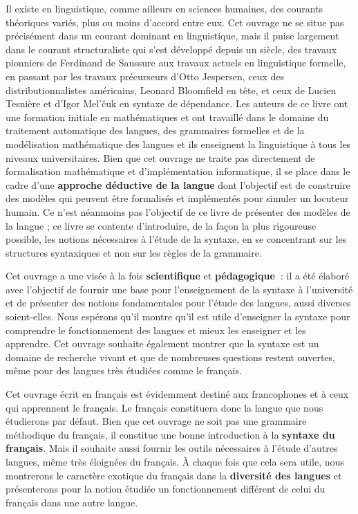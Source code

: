 Il existe en linguistique, comme ailleurs en sciences humaines, des courants théoriques variés, plus ou moins d’accord entre eux. Cet ouvrage ne se situe pas précisément dans un courant dominant en linguistique, mais il puise largement dans le courant structuraliste qui s’est développé depuis un siècle, des travaux pionniers de Ferdinand de Saussure aux travaux actuels en linguistique formelle, en passant par les travaux précurseurs d’Otto Jespersen, ceux des distributionnalistes américains, Leonard Bloomfield en tête, et ceux de Lucien Tesnière et d’Igor Mel’čuk en syntaxe de dépendance. Les auteurs de ce livre ont une formation initiale en mathématiques et ont travaillé dans le domaine du traitement automatique des langues, des grammaires formelles et de la modélisation mathématique des langues et ils enseignent la linguistique à tous les niveaux universitaires. Bien que cet ouvrage ne traite pas directement de formalisation mathématique et d’implémentation informatique, il se place dans le cadre d’une \textbf{approche déductive de la langue} dont l’objectif est de construire des modèles qui peuvent être formalisés et implémentés pour simuler un locuteur humain. Ce n’est néanmoins pas l’objectif de ce livre de présenter des modèles de la langue ; ce livre se contente d’introduire, de la façon la plus rigoureuse possible, les notions nécessaires à l’étude de la syntaxe, en se concentrant sur les structures syntaxiques et non sur les règles de la grammaire.

Cet ouvrage a une visée à la fois \textbf{scientifique} et \textbf{pédagogique~}: il a été élaboré avec l’objectif de fournir une base pour l’enseignement de la syntaxe à l’université et de présenter des notions fondamentales pour l’étude des langues, aussi diverses soient-elles. Nous espérons qu’il montre qu’il est utile d’enseigner la syntaxe pour comprendre le fonctionnement des langues et mieux les enseigner et les apprendre. Cet ouvrage souhaite également montrer que la syntaxe est un domaine de recherche vivant et que de nombreuses questions restent ouvertes, même pour des langues très étudiées comme le français.

Cet ouvrage écrit en français est évidemment destiné aux francophones et à ceux qui apprennent le français. Le français constituera donc la langue que nous étudierons par défaut. Bien que cet ouvrage ne soit pas une grammaire méthodique du français, il constitue une bonne introduction à la \textbf{syntaxe du français}. Mais il souhaite aussi fournir les outils nécessaires à l’étude d’autres langues, même très éloignées du français. À chaque fois que cela sera utile, nous montrerons le caractère exotique du français dans la \textbf{diversité des langues} et présenterons pour la notion étudiée un fonctionnement différent de celui du français dans une autre langue.



